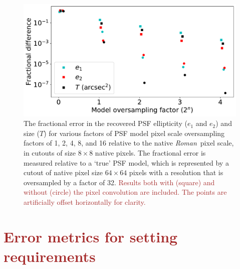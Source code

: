 \documentclass[usenatbib]{mnras}
\newcommand{\wfirst}{{\slshape Roman}}
\newcommand{\changetext}[1]{\textcolor{brown}{#1}}
\begin{document}
\begin{figure}
\begin{center}
\includegraphics[width=\columnwidth]{figures/psf_oversampling.pdf}
\end{center}
\caption[]{
The fractional error in the recovered PSF ellipticity ($e_1$ and $e_2$) and size ($T$) for various factors of PSF model pixel scale oversampling factors of 1, 2, 4, 8, and 16 relative to the native \wfirst\ pixel scale, in cutouts of size $8\times 8$ native pixels. The fractional error is measured relative to a `true' PSF model, which is represented by a cutout of native pixel size $64\times64$ pixels with a resolution that is oversampled by a factor of 32. \changetext{Results both with (square) and without (circle) the pixel convolution are included. The points are artificially offset horizontally for clarity.}
\label{fig:psf_oversampling}}
\end{figure}

\section{\changetext{Error metrics for setting requirements}}
\label{app:reqpar}
\end{document}
